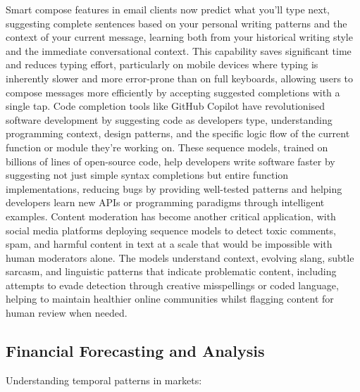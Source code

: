 Smart compose features in email clients now predict what you'll type next, suggesting complete sentences based on your personal writing patterns and the context of your current message, learning both from your historical writing style and the immediate conversational context. This capability saves significant time and reduces typing effort, particularly on mobile devices where typing is inherently slower and more error-prone than on full keyboards, allowing users to compose messages more efficiently by accepting suggested completions with a single tap. Code completion tools like GitHub Copilot have revolutionised software development by suggesting code as developers type, understanding programming context, design patterns, and the specific logic flow of the current function or module they're working on. These sequence models, trained on billions of lines of open-source code, help developers write software faster by suggesting not just simple syntax completions but entire function implementations, reducing bugs by providing well-tested patterns and helping developers learn new APIs or programming paradigms through intelligent examples. Content moderation has become another critical application, with social media platforms deploying sequence models to detect toxic comments, spam, and harmful content in text at a scale that would be impossible with human moderators alone. The models understand context, evolving slang, subtle sarcasm, and linguistic patterns that indicate problematic content, including attempts to evade detection through creative misspellings or coded language, helping to maintain healthier online communities whilst flagging content for human review when needed.

\subsection{Financial Forecasting and Analysis}

Understanding temporal patterns in markets:

